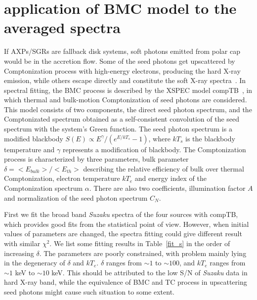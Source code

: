 \documentclass[]{raa}
\begin{document}
\section{application of BMC model to the averaged spectra}

If AXPs/SGRs are fallback disk systems, soft photons emitted from polar cap would be in the accretion flow.
%
Some of the seed photons get upscattered by Comptonization process with high-energy electrons, producing the hard X-ray emission, while others escape directly and constitute the soft X-ray spectra~\citep{Trumper10}.
%
In spectral fitting, the BMC process is described by the XSPEC model compTB~\citep{Farinelli08}, in which thermal and bulk-motion Comptonization of seed photons are considered. 
%
This model consists of two components, the direct seed photon spectrum, and the Comptonizated spectrum obtained as a self-consistent convolution of the seed spectrum with the system's Green function.
%
The seed photon spectrum is a modified blackbody $S(E) \propto E^\gamma / (e^{E/kT_s}-1)$, where $kT_s$ is the blackbody temperature and $\gamma$ represents a modification of blackbody.
%
The Comptonization process is characterized by three parameters, bulk parameter $\delta=<E_{bulk}>/<E_{th}>$ describing the relative efficiency of bulk over thermal Comptonization, electron temperature $kT_e$ and energy index of the Comptonization spectrum $\alpha$. 
%
There are also two coefficients, illumination factor $A$ and normalization of the seed photon spectrum $C_N$.
%


First we fit the broad band {\it Suzaku} spectra of the four sources with compTB, which provides good fits from the statistical point of view.
%
However, when initial values of parameters are changed, the spectra fitting could give different result with similar $\chi^2$.
%
We list some fitting results in Table~\ref{fit_s} in the order of increasing $\delta$. 
%
The parameters are poorly constrained, with problem mainly lying in the  degeneracy of $\delta$ and $kT_e$.
%
$\delta$ ranges from $\sim 1$ to $\sim 100$, and $kT_e$ ranges from $\sim 1$ keV to $\sim 10$ keV.
%
This should be attributed to the low S/N of {\it Suzaku} data in hard X-ray band, while the equivalence of BMC and TC process in upscattering seed photons might cause such situation to some extent.
%
\end{document}
